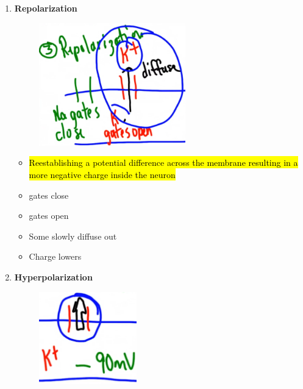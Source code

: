 \documentclass[a4paper,12pt]{article}
\begin{document}
\begin{enumerate}
{\begin{figure}[H]
            \end{figure}
            \begin{itemize}
                \item{ gates close}
                \item{ gates open,  flood in}
                \item{Charge jumps to +\SI{40}{\mV}}
            \end{itemize}
        }
    \item{
            \textbf{Repolarization}
            \begin{figure}[H]
                \centering
                \includegraphics[width=0.60\textwidth]{n3}
            \end{figure}
            \begin{itemize}
                \item{\hl{Reestablishing a potential difference across the membrane resulting in a more negative charge inside the neuron}}
                \item{ gates close}
                \item{ gates open}
                \item{Some  slowly diffuse out}
                \item{Charge lowers}
            \end{itemize}
        }
    \item{
            \textbf{Hyperpolarization}
            \begin{figure}[H]
                \centering
                \includegraphics[width=0.40\textwidth]{n4}

\end{figure}}
\end{enumerate}
\end{document}
